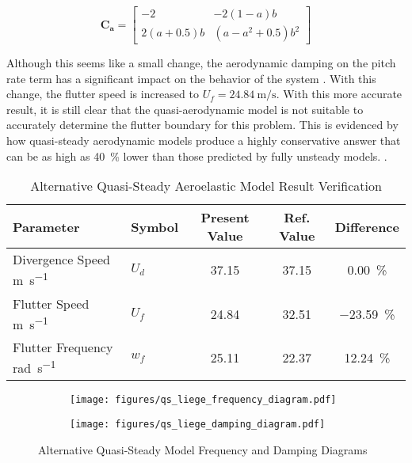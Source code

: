 \begin{equation}
    \label{eq:qs_liege}
    \bm{C_a} =
    \begin{bmatrix}
        -2 & -2\left(1 - a\right)b \\
        2\left(a + 0.5\right)b & \left(a - a^2 + 0.5\right)b^2
    \end{bmatrix}
\end{equation}

Although this seems like a small change, the aerodynamic damping on the pitch
rate term has a significant impact on the behavior of the system
\autocite[p.168]{wrightIntroductionAircraftAeroelasticity}. With this change,
the flutter speed is increased to $\boxed{U_f =
\SI{24.84}{\meter\per\second}}$. With this more accurate result, it is still
clear that the quasi-aerodynamic model is not suitable to accurately determine
the flutter boundary for this problem. This is evidenced by how quasi-steady
aerodynamic models produce a highly conservative answer that can be as high as
\SI{40}{\percent} lower than those predicted by fully unsteady models.
\autocite[p.568]{bisplinghoffAeroelasticity1996}.

\begin{table}[H]
    \centering
    \caption{Alternative Quasi-Steady Aeroelastic Model Result Verification}
    \label{tab:qs_liege_verification}
    \begin{tabularx}{\textwidth}{p{}P{0.1\textwidth}CCC}
    \toprule
    \textbf{Parameter} & \textbf{Symbol} &\textbf{Present Value}
    &\textbf{Ref. Value \autocite{howcroftEfficientAeroelasticBeam2019}}
    & \textbf{Difference} \\
    \midrule
    Divergence Speed \si{\meter\per\second}
    & $U_d$ & 37.15 & 37.15 & \SI{0.00}{\percent}\\
    Flutter Speed \si{\meter\per\second}
    & $U_f$ & 24.84 & 32.51 & \SI{-23.59}{\percent}\\
    Flutter Frequency \si{\radian\per\second}
    & $w_f$ & 25.11 & 22.37 & \SI{12.24}{\percent}\\ \bottomrule
    \end{tabularx}
\end{table}

\begin{figure}[H]
    \centering
    \begin{subfigure}[b]{0.5\textwidth}
      \centering
      \texttt{[image: figures/qs\_liege\_frequency\_diagram.pdf]}
      \label{fig:qs_liege_frequency}
    \end{subfigure}%
    \begin{subfigure}[b]{0.5\textwidth}
      \centering
      \texttt{[image: figures/qs\_liege\_damping\_diagram.pdf]}
      \label{fig:qs_liege_damping}
    \end{subfigure}
    \caption{Alternative Quasi-Steady Model Frequency and Damping Diagrams} %
    \label{fig:qs_liege_flutter_diagram}
\end{figure}

